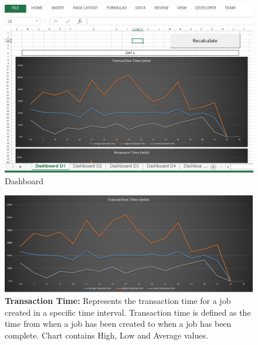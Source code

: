 \documentclass[paper=letter, fontsize=10pt]{scrartcl}
\numberwithin{equation}{section}		%
\numberwithin{figure}{section}			%
\numberwithin{table}{section}				%
\begin{document}
	\begin{figure}[!htbp]
	\begin{center}
		\includegraphics[width=1\columnwidth, height=0.4\textheight, keepaspectratio]{Dashboard.png}
		\caption{Dashboard}
	\end{center}
	\end{figure}
	
		\begin{figure}[!htbp]
		\begin{center}
			\includegraphics[width=1\columnwidth, height=0.3\textheight, keepaspectratio]{transactionTime.png}
			\caption{\textbf{Transaction Time:} Represents the transaction time for a job created in a specific time interval. Transaction time is defined as the time from when a job has been created to when a job has been complete. Chart contains High, Low and Average values.}
		\vspace{-5em}
		\end{center}
		\end{figure}
		
\end{document}
